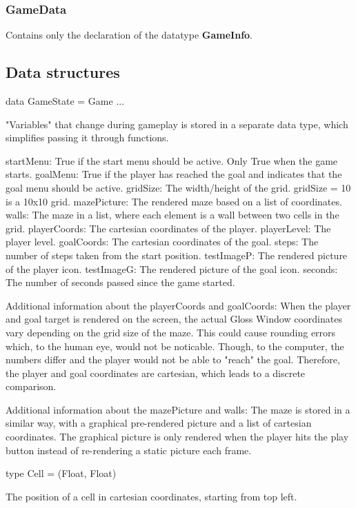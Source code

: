 \documentclass[12pt, a4paper]{article}
\begin{document}
\subsubsection{GameData}
Contains only the declaration of the datatype \textbf{GameInfo}.

\subsection{Data structures}
\begin{code}
data GameState = Game { ... }
\end{code}
"Variables" that change during gameplay is stored in a separate data type, which simplifies passing it through functions.

startMenu: True if the start menu should be active. Only True when the game starts.
goalMenu: True if the player has reached the goal and indicates that the goal menu should be active.
gridSize: The width/height of the grid. gridSize = 10 is a 10x10 grid.
mazePicture: The rendered maze based on a list of coordinates.
walls: The maze in a list, where each element is a wall between two cells in the grid.
playerCoords: The cartesian coordinates of the player.
playerLevel: The player level.
goalCoords: The cartesian coordinates of the goal.
steps: The number of steps taken from the start position.
testImageP: The rendered picture of the player icon.
testImageG: The rendered picture of the goal icon.
seconds: The number of seconds passed since the game started.

Additional information about the playerCoords and goalCoords:
When the player and goal target is rendered on the screen, the actual Gloss Window coordinates vary depending on the grid size of the maze. This could cause rounding errors which, to the human eye, would not be noticable. Though, to the computer, the numbers differ and the player would not be able to "reach" the goal. Therefore, the player and goal coordinates are cartesian, which leads to a discrete comparison.

Additional information about the mazePicture and walls:
The maze is stored in a similar way, with a graphical pre-rendered picture and a list of cartesian coordinates. The graphical picture is only rendered when the player hits the play button instead of re-rendering a static picture each frame.

\begin{code}
type Cell = (Float, Float)
\end{code}
The position of a cell in cartesian coordinates, starting from top left.
\end{document}
